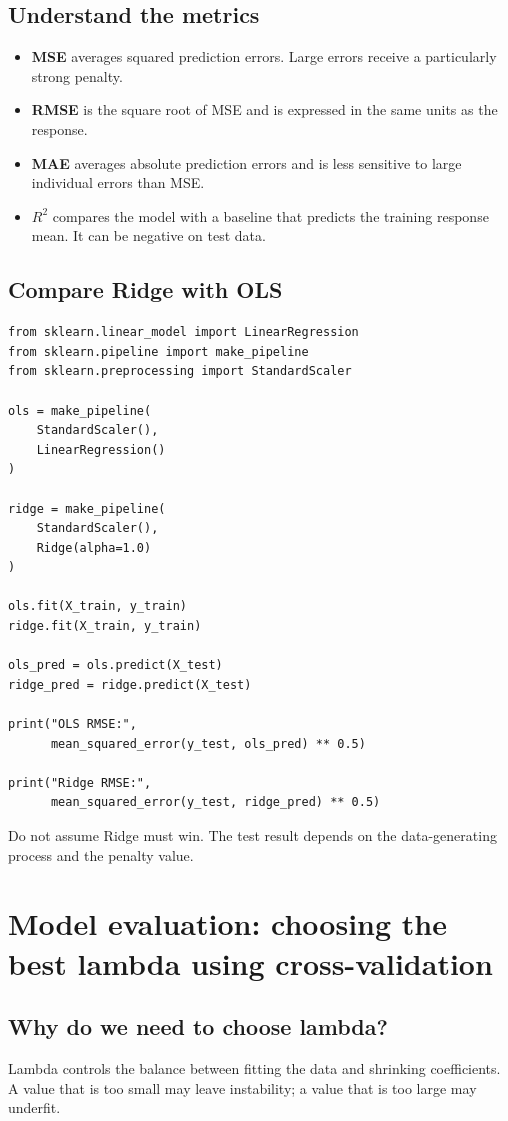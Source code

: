 \documentclass[11pt,a4paper]{article}
\numberwithin{equation}{section}
\theoremstyle{remark}
\begin{document}
\subsection{Understand the metrics}
\begin{itemize}
\item \textbf{MSE} averages squared prediction errors. Large errors receive
a particularly strong penalty.
\item \textbf{RMSE} is the square root of MSE and is expressed in the same
units as the response.
\item \textbf{MAE} averages absolute prediction errors and is less sensitive
to large individual errors than MSE.
\item \textbf{$R^2$} compares the model with a baseline that predicts the
training response mean. It can be negative on test data.
\end{itemize}

\subsection{Compare Ridge with OLS}
\begin{lstlisting}
from sklearn.linear_model import LinearRegression
from sklearn.pipeline import make_pipeline
from sklearn.preprocessing import StandardScaler

ols = make_pipeline(
    StandardScaler(),
    LinearRegression()
)

ridge = make_pipeline(
    StandardScaler(),
    Ridge(alpha=1.0)
)

ols.fit(X_train, y_train)
ridge.fit(X_train, y_train)

ols_pred = ols.predict(X_test)
ridge_pred = ridge.predict(X_test)

print("OLS RMSE:",
      mean_squared_error(y_test, ols_pred) ** 0.5)

print("Ridge RMSE:",
      mean_squared_error(y_test, ridge_pred) ** 0.5)
\end{lstlisting}

Do not assume Ridge must win. The test result depends on the data-generating
process and the penalty value.

\section{Model evaluation: choosing the best lambda using cross-validation}

\subsection{Why do we need to choose lambda?}
Lambda controls the balance between fitting the data and shrinking
coefficients. A value that is too small may leave instability; a value that
is too large may underfit.
\end{document}

